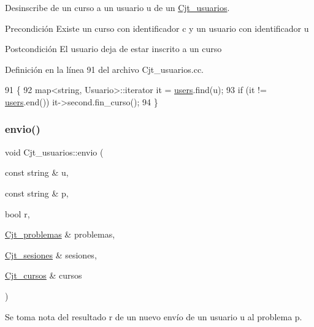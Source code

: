 Desinscribe de un curso a un usuario u de un \mbox{\hyperlink{class_cjt__usuarios}{Cjt\+\_\+usuarios}}. 

\begin{DoxyPrecond}{Precondición}
Existe un curso con identificador c y un usuario con identificador u 
\end{DoxyPrecond}
\begin{DoxyPostcond}{Postcondición}
El usuario deja de estar inscrito a un curso 
\end{DoxyPostcond}


Definición en la línea 91 del archivo Cjt\+\_\+usuarios.\+cc.


\begin{DoxyCode}
91                                                   \{
92         map<string, Usuario>::iterator it = \mbox{\hyperlink{class_cjt__usuarios_a0b702ca0184d6fb2674cc827d39d5bff}{users}}.find(u);
93         \textcolor{keywordflow}{if} (it != \mbox{\hyperlink{class_cjt__usuarios_a0b702ca0184d6fb2674cc827d39d5bff}{users}}.end()) it->second.fin\_curso();
94       \}
\end{DoxyCode}
\mbox{\label{class_cjt__usuarios_ac4e3616bd8af5d118d4039d203805e76}} 
\subsubsection{\texorpdfstring{envio()}{envio()}}
{\footnotesize\ttfamily void Cjt\+\_\+usuarios\+::envio (\begin{DoxyParamCaption}\item[{const string \&}]{u,  }\item[{const string \&}]{p,  }\item[{bool}]{r,  }\item[{\mbox{\hyperlink{class_cjt__problemas}{Cjt\+\_\+problemas}} \&}]{problemas,  }\item[{\mbox{\hyperlink{class_cjt__sesiones}{Cjt\+\_\+sesiones}} \&}]{sesiones,  }\item[{\mbox{\hyperlink{class_cjt__cursos}{Cjt\+\_\+cursos}} \&}]{cursos }\end{DoxyParamCaption})}



Se toma nota del resultado r de un nuevo envío de un usuario u al problema p. 

